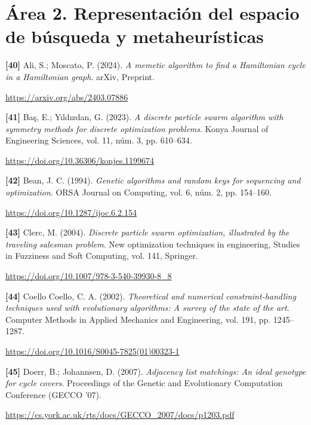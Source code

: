 \documentclass[11pt,a4paper]{article}
\newcommand{\referencia}[1]{\par\addvspace{0.8\baselineskip}\noindent\hangindent=1.1cm\hangafter=1 #1\par\nopagebreak}
\begin{document}
\section*{Área 2. Representación del espacio de búsqueda y metaheurísticas}
\begin{samepage}
\referencia{\textbf{[40]} Ali, S.; Moscato, P. (2024). \textit{A memetic algorithm to find a {Hamiltonian} cycle in a {Hamiltonian} graph}. arXiv, Preprint.}
 {\small\url{https://arxiv.org/abs/2403.07886}}\par
\end{samepage}
\begin{samepage}
\referencia{\textbf{[41]} Ba{\c{s}}, E.; Y{\i}ld{\i}zdan, G. (2023). \textit{A discrete particle swarm algorithm with symmetry methods for discrete optimization problems}. Konya Journal of Engineering Sciences, vol. 11, núm. 3, pp. 610--634.}
 {\small\url{https://doi.org/10.36306/konjes.1199674}}\par
\end{samepage}
\begin{samepage}
\referencia{\textbf{[42]} Bean, J. C. (1994). \textit{Genetic algorithms and random keys for sequencing and optimization}. ORSA Journal on Computing, vol. 6, núm. 2, pp. 154--160.}
 {\small\url{https://doi.org/10.1287/ijoc.6.2.154}}\par
\end{samepage}
\begin{samepage}
\referencia{\textbf{[43]} Clerc, M. (2004). \textit{Discrete particle swarm optimization, illustrated by the traveling salesman problem}. New optimization techniques in engineering, Studies in Fuzziness and Soft Computing, vol. 141, Springer.}
 {\small\url{https://doi.org/10.1007/978-3-540-39930-8_8}}\par
\end{samepage}
\begin{samepage}
\referencia{\textbf{[44]} Coello Coello, C. A. (2002). \textit{Theoretical and numerical constraint-handling techniques used with evolutionary algorithms: A survey of the state of the art}. Computer Methods in Applied Mechanics and Engineering, vol. 191, pp. 1245--1287.}
 {\small\url{https://doi.org/10.1016/S0045-7825(01)00323-1}}\par
\end{samepage}
\begin{samepage}
\referencia{\textbf{[45]} Doerr, B.; Johannsen, D. (2007). \textit{Adjacency list matchings: An ideal genotype for cycle covers}. Proceedings of the Genetic and Evolutionary Computation Conference ({GECCO} '07).}
 {\small\url{https://cs.york.ac.uk/rts/docs/GECCO_2007/docs/p1203.pdf}}\par
\end{samepage}
\end{document}
